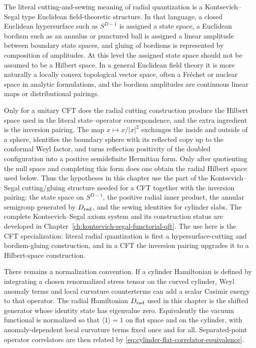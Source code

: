 The literal cutting-and-sewing meaning of radial quantization is a
Kontsevich--Segal type Euclidean field-theoretic structure.  In that language,
a closed Euclidean hypersurface such as \(S^{D-1}\) is assigned a state space,
a Euclidean bordism such as an annulus or punctured ball is assigned a linear
amplitude between boundary state spaces, and gluing of bordisms is represented
by composition of amplitudes.  At this level the assigned state space should
not be assumed to be a Hilbert space.  In a general Euclidean field theory it
is more naturally a locally convex topological vector space, often a
Fr\'echet or nuclear space in analytic formulations, and the bordism
amplitudes are continuous linear maps or distributional pairings.

Only for a unitary CFT does the radial cutting construction produce the
Hilbert space used in the literal state--operator correspondence, and the
extra ingredient is the inversion pairing.  The map \(x\mapsto x/|x|^2\)
exchanges the inside and outside of a sphere, identifies the boundary sphere
with its reflected copy up to the conformal Weyl factor, and turns reflection
positivity of the doubled configuration into a positive semidefinite Hermitian
form.  Only after quotienting the null space and completing this form does one
obtain the radial Hilbert space used below.  Thus the hypotheses in this
chapter use the part of the Kontsevich--Segal cutting/gluing structure needed
for a CFT together with the inversion pairing: the state space on \(S^{D-1}\),
the positive radial inner product, the annular semigroup generated by
\(D_{\rm rad}\), and the sewing identities for cylinder slabs.  The complete
Kontsevich--Segal axiom system and its construction status are
developed in Chapter~\ref{ch:kontsevich-segal-functorial-qft}.  The use here
is the CFT specialization: literal radial quantization is first a
hypersurface-cutting and bordism-gluing construction, and in a CFT the
inversion pairing upgrades it to a Hilbert-space construction.

There remains a normalization convention.  If a cylinder Hamiltonian is defined
by integrating a chosen renormalized stress tensor on the curved cylinder, Weyl
anomaly terms and local curvature counterterms can add a scalar Casimir energy
to that operator.  The radial Hamiltonian \(D_{\rm rad}\) used in this chapter
is the shifted generator whose identity state has eigenvalue zero.  Equivalently
the vacuum functional is normalized so that \(\langle 1\rangle=1\) on flat
space and on the cylinder, with anomaly-dependent local curvature terms fixed
once and for all.  Separated-point operator correlators are then related by
\eqref{eq:cylinder-flat-correlator-equivalence}.

